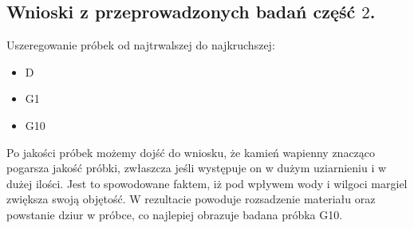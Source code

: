 \subsection{Wnioski z przeprowadzonych badań część $2$.}

Uszeregowanie próbek od najtrwalszej do najkruchszej:
\begin{itemize}
    \item D
    \item G1
    \item G10
\end{itemize}

Po jakości próbek możemy dojść do wniosku, że kamień wapienny znacząco pogarsza jakość próbki, zwłaszcza jeśli występuje on w dużym uziarnieniu i w dużej ilości. Jest to spowodowane faktem, iż pod wpływem wody i wilgoci margiel zwiększa swoją objętość. W rezultacie powoduje rozsadzenie materiału oraz powstanie dziur w próbce, co najlepiej obrazuje badana próbka G10.

% 
% 

